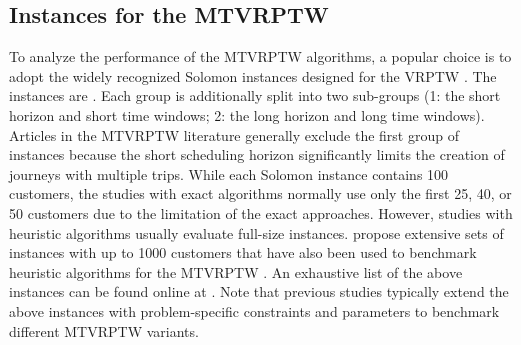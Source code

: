 

\subsection{Instances for the MTVRPTW}

To analyze the performance of the MTVRPTW algorithms, a popular choice is to adopt the widely recognized Solomon instances designed for the VRPTW \citep{solomon1987algorithms}.  The instances are .  Each group is additionally split into two sub-groups (1: the short horizon and short time windows; 2: the long horizon and long time windows).  Articles in the MTVRPTW literature generally exclude the first group of instances because the short scheduling horizon significantly limits the creation of journeys with multiple trips.  While each Solomon instance contains 100 customers, the studies with exact algorithms normally use only the first 25, 40, or 50 customers due to the limitation of the exact approaches.  However, studies with heuristic algorithms usually evaluate full-size instances.  \cite{gehring1999parallel} propose extensive sets of instances with up to 1000 customers that have also been used to benchmark heuristic algorithms for the MTVRPTW \citep[see][]{cattaruzza2014iterated}.  An exhaustive list of the above instances can be found online at \cite{sintef}.  Note that previous studies typically extend the above instances with problem-specific constraints and parameters to benchmark different MTVRPTW variants.

